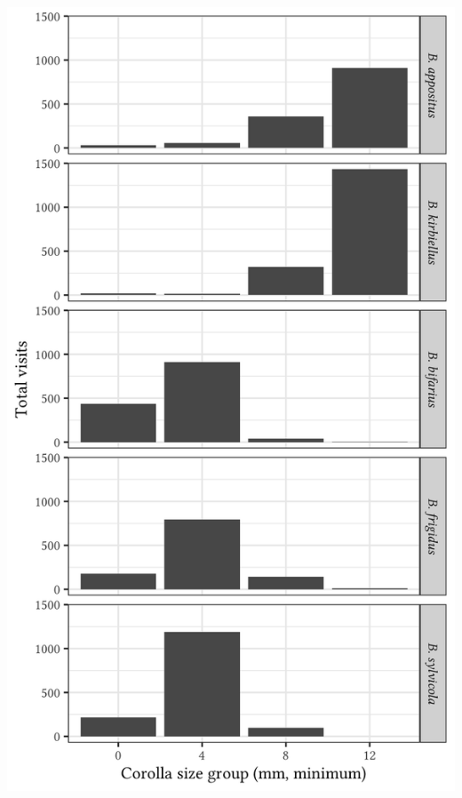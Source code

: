 \documentclass[12pt, hidelinks]{exam}
\begin{document}
\begin{questions}
\ifprintanswers
	\includegraphics[height=\textheight]{flower_visits_key}
\else

\end{questions}
\end{document}
